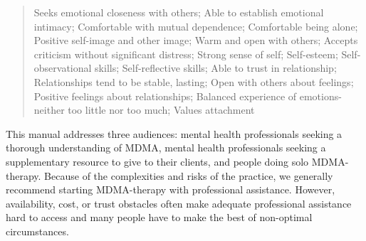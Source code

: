 \documentclass[12pt,letterpaper]{article}
\begin{document}
\begin{quotation}
Seeks emotional closeness with others; Able to establish emotional intimacy; Comfortable with mutual dependence; Comfortable being alone; Positive self-image and other image; Warm and open with others; Accepts criticism without significant distress; Strong sense of self; Self-esteem; Self-observational skills; Self-reflective skills; Able to trust in relationship; Relationships tend to be stable, lasting; Open with others about feelings; Positive feelings about relationships; Balanced experience of emotions-neither too little nor too much; Values attachment
\end{quotation}

This manual addresses three audiences: mental health professionals seeking a thorough understanding of MDMA, mental health professionals seeking a supplementary resource to give to their clients, and people doing solo MDMA-therapy. Because of the complexities and risks of the practice, we generally recommend starting MDMA-therapy with professional assistance. However, availability, cost, or trust obstacles often make adequate professional assistance hard to access and many people have to make the best of non-optimal circumstances.
\end{document}
